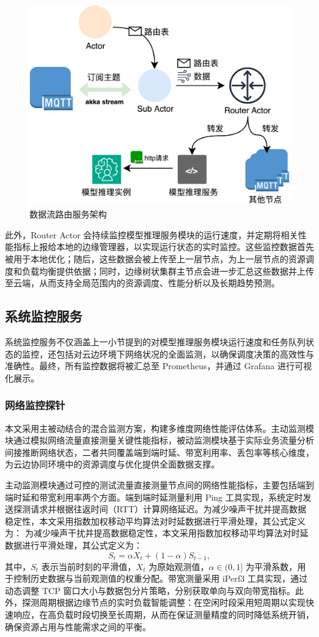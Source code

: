 \begin{figure}[ht]
  \centering
  \includegraphics[width=0.75\linewidth]{pics/4-6worker.png}
  \caption{数据流路由服务架构}
  \label{fig:data-routing-architecture}
\end{figure}

此外，Router Actor 会持续监控模型推理服务模块的运行速度，并定期将相关性能指标上报给本地的边缘管理器，以实现运行状态的实时监控。这些监控数据首先被用于本地优化；随后，这些数据会被上传至上一层节点，为上一层节点的资源调度和负载均衡提供依据；同时，边缘树状集群主节点会进一步汇总这些数据并上传至云端，从而支持全局范围内的资源调度、性能分析以及长期趋势预测。

\subsection{系统监控服务}

系统监控服务不仅涵盖上一小节提到的对模型推理服务模块运行速度和任务队列状态的监控，还包括对云边环境下网络状况的全面监测，以确保调度决策的高效性与准确性。最终，所有监控数据将被汇总至 Prometheus，并通过 Grafana 进行可视化展示。

\subsubsection{网络监控探针}

本文采用主被动结合的混合监测方案，构建多维度网络性能评估体系。主动监测模块通过模拟网络流量直接测量关键性能指标，被动监测模块基于实际业务流量分析间接推断网络状态，二者共同覆盖端到端时延、带宽利用率、丢包率等核心维度，为云边协同环境中的资源调度与优化提供全面数据支撑。

主动监测模块通过可控的测试流量直接测量节点间的网络性能指标，主要包括端到端时延和带宽利用率两个方面。端到端时延测量利用 Ping 工具实现，系统定时发送探测请求并根据往返时间（RTT）计算网络延迟。为减少噪声干扰并提高数据稳定性，本文采用指数加权移动平均算法对时延数据进行平滑处理，其公式定义为：
为减少噪声干扰并提高数据稳定性，本文采用指数加权移动平均算法对时延数据进行平滑处理，其公式定义为：
\[
S_t = \alpha X_t + (1-\alpha)S_{t-1},
\]
其中，$S_t$ 表示当前时刻的平滑值，$X_t$ 为原始观测值，$\alpha \in (0,1]$ 为平滑系数，用于控制历史数据与当前观测值的权重分配。带宽测量采用 iPerf3 工具实现，通过动态调整 TCP 窗口大小与数据包分片策略，分别获取单向与双向带宽指标。此外，探测周期根据边缘节点的实时负载智能调整：在空闲时段采用短周期以实现快速响应，在高负载时段切换至长周期，从而在保证测量精度的同时降低系统开销，确保资源占用与性能需求之间的平衡。

